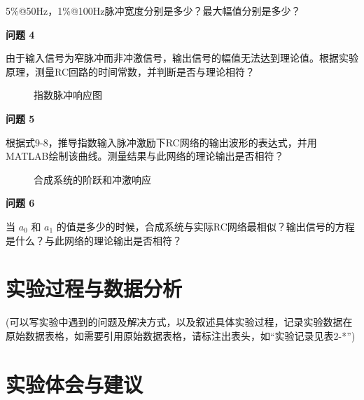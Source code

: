 \documentclass{sasreport}
\begin{document}
5\%@50Hz，1\%@100Hz脉冲宽度分别是多少？最大幅值分别是多少？

\textbf{问题 4}

由于输入信号为窄脉冲而非冲激信号，输出信号的幅值无法达到理论值。根据实验原理，测量RC回路的时间常数，并判断是否与理论相符？

\begin{figure}[H]
    \caption{指数脉冲响应图}

\end{figure}

\textbf{问题 5}

根据式9-8，推导指数输入脉冲激励下RC网络的输出波形的表达式，并用MATLAB绘制该曲线。测量结果与此网络的理论输出是否相符？

\begin{figure}[H]
    \caption{合成系统的阶跃和冲激响应}

\end{figure}

\textbf{问题 6}

当 $a_0$ 和 $a_1$ 的值是多少的时候，合成系统与实际RC网络最相似？输出信号的方程是什么？与此网络的理论输出是否相符？

\section{实验过程与数据分析}
 {\kaishu (可以写实验中遇到的问题及解决方式，以及叙述具体实验过程，记录实验数据在原始数据表格，如需要引用原始数据表格，请标注出表头，如“实验记录见表2-*”)}

\section{实验体会与建议}
\end{document}
